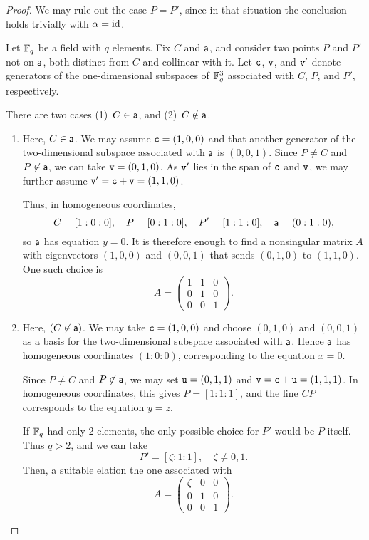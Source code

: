 \begin{proof}
    We may rule out the case $P = P'$, since in that situation the conclusion holds trivially with $\alpha = \operatorname{id}$.  

    Let $\mathbb{F}_{q}$ be a field with $q$ elements. Fix $C$ and $\mathsf{a}$, and consider two points $P$ and $P'$ not on $\mathsf{a}$, both distinct from $C$ and collinear with it. Let $\mathtt c$, $\mathtt v$, and $\mathtt v'$ denote generators of the one-dimensional subspaces of $\mathbb{F}_{q}^3$ associated with $C$, $P$, and $P'$, respectively.

    There are two cases (1)~$C\in\mathsf a$, and (2)~$C\notin\mathsf a$.
    \begin{enumerate}[(1)]
        \item Here, $C \in \mathsf{a}$. We may assume $\mathtt c = (1,0,0)$ and that another generator of the two-dimensional subspace associated with $\mathsf{a}$ is $(0,0,1)$. Since $P \ne C$ and $P \not\in \mathsf{a}$, we can take $\mathtt v = (0,1,0)$. As $\mathtt v'$ lies in the span of $\mathtt c$ and $\mathtt v$, we may further assume $\mathtt v' = \mathtt c + \mathtt v = (1,1,0)$.  
    
        Thus, in homogeneous coordinates,
        \[
            C = [1:0:0], \quad P = [0:1:0], \quad P' = [1:1:0],
                \quad \mathsf{a} = (0:1:0),
        \]
        so $\mathsf{a}$ has equation $y = 0$.  
        It is therefore enough to find a nonsingular matrix $A$ with eigenvectors $(1,0,0)$ and $(0,0,1)$ that sends $(0,1,0)$ to $(1,1,0)$. One such choice is
        \[
            A = \begin{pmatrix}
                1 & 1 & 0 \\
                0 & 1 & 0 \\
                0 & 0 & 1
            \end{pmatrix}.
        \]

        \item Here, $(C \not\in \mathsf{a})$. We may take $\mathtt c = (1,0,0)$ and choose $(0,1,0)$ and $(0,0,1)$ as a basis for the two-dimensional subspace associated with $\mathsf{a}$. Hence $\mathsf{a}$ has homogeneous coordinates $(1:0:0)$, corresponding to the equation $x = 0$.  
        
        Since $P \ne C$ and $P \not\in \mathsf{a}$, we may set $\mathtt u = (0,1,1)$ and $\mathtt v = \mathtt c + \mathtt u = (1,1,1)$. In homogeneous coordinates, this gives $P = [1:1:1]$, and the line $CP$ corresponds to the equation $y = z$.  
        
        If $\mathbb{F}_{q}$ had only $2$ elements, the only possible choice for $P'$ would be $P$ itself. Thus $q > 2$, and we can take
        \[
            P' = [\zeta:1:1], \quad \zeta \ne 0,1.
        \]
        Then, a suitable elation the one associated with
        \[
            A = \begin{pmatrix}
                \zeta & 0 & 0 \\
                0 & 1 & 0 \\
                0 & 0 & 1
            \end{pmatrix}.
        \]
    \end{enumerate}
\end{proof}

